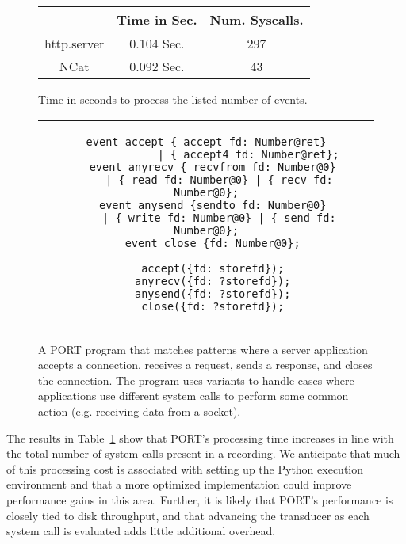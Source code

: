 \begin{figure}
  \begin{tabular}{|c|c|c}
                & Time in Sec. & Num. Syscalls.\\
              \hline
  http.server   & 0.104 Sec.   & 297   \\
  NCat          & 0.092 Sec.   & 43      \\
\end{tabular}
\caption{Time in seconds to process the listed number of events.}
\label{tbl:RealWorldPerformance}
\end{figure}

\begin{figure}
\centering
\begin{tabular}{c}
\begin{lstlisting}[gobble=2]
  event accept { accept fd: Number@ret}
             | { accept4 fd: Number@ret};
  event anyrecv { recvfrom fd: Number@0}
    | { read fd: Number@0} | { recv fd: Number@0};
  event anysend {sendto fd: Number@0}
    | { write fd: Number@0} | { send fd: Number@0};
  event close {fd: Number@0};

  accept({fd: storefd});
  anyrecv({fd: ?storefd});
  anysend({fd: ?storefd});
  close({fd: ?storefd});
\end{lstlisting}
\end{tabular}
\caption{A PORT program that matches patterns where a server application
  accepts a connection, receives a request, sends a response, and closes
  the connection.  The program uses variants to handle cases where
  applications use different system calls to perform some common action
  (e.g. receiving data from a socket).}
\label{lst:RealWorldPerformance}
\end{figure}

The results in Table~\ref{tbl:RealWorldPerformance} show that
PORT's
processing time increases in line with the total number of system calls
present in a recording.  We anticipate that much of this processing cost is
associated with setting up the Python execution environment and that a more
optimized implementation could improve performance gains in this area.
Further,
it is likely that PORT's performance is closely tied to
disk throughput,
and that advancing the transducer
as each system call is evaluated
adds little additional overhead.

